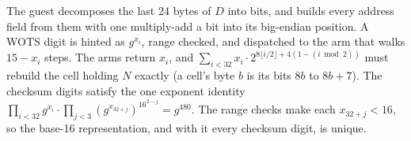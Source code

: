 \documentclass[11pt]{article}
\begin{document}
The guest decomposes the last 24 bytes of $D$ into bits, and builds every address field from them with one multiply-add a bit into its big-endian position. A WOTS digit is hinted as $g^{x_i}$, range checked, and dispatched to the arm that walks $15-x_i$ steps. The arms return $x_i$, and $\sum_{i<32}x_i\cdot 2^{8\lfloor i/2\rfloor+4(1-(i\bmod2))}$ must rebuild the cell holding $N$ exactly (a cell's byte $b$ is its bits $8b$ to $8b+7$). The checksum digits satisfy the one exponent identity $\prod_{i<32}g^{x_i}\cdot\prod_{j<3}(g^{x_{32+j}})^{16^{2-j}}=g^{480}$. The range checks make each $x_{32+j}<16$, so the base-16 representation, and with it every checksum digit, is unique.



\end{document}
